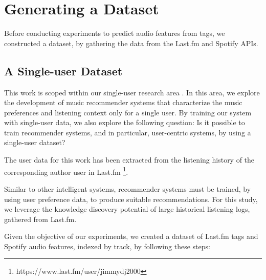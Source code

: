 \documentclass[sn-mathphys]{sn-jnl}%
\theoremstyle{thmstyleone}%
\theoremstyle{thmstyletwo}%
\theoremstyle{thmstylethree}%
\begin{document}
%

\section{Generating a Dataset}




Before conducting experiments to predict audio features from tags,
we constructed a dataset, by gathering the data from the Last.fm and Spotify APIs.

\subsection{A Single-user Dataset}

This work is scoped within our single-user research area \cite{ramirez2022user}.
In this area, we explore the development of music recommender systems that
characterize the music preferences and listening context only for a single user.
By training our system with single-user data, we also explore the following question: Is it possible to train
recommender systems, and in particular, user-centric systems, by using a single-user dataset?

The user data for this work has been extracted from the
listening history of the corresponding author user in Last.fm
\footnote[4]{https://www.last.fm/user/jimmydj2000}.


Similar to other intelligent systems, recommender systems
must be trained, by using user preference data, to produce
suitable recommendations. For this study,
we leverage the knowledge discovery potential
of large historical listening logs, gathered from Last.fm.

Given the objective of our experiments,
we created a dataset of Last.fm tags and Spotify audio features, indexed by track, by following these steps:
\end{document}
